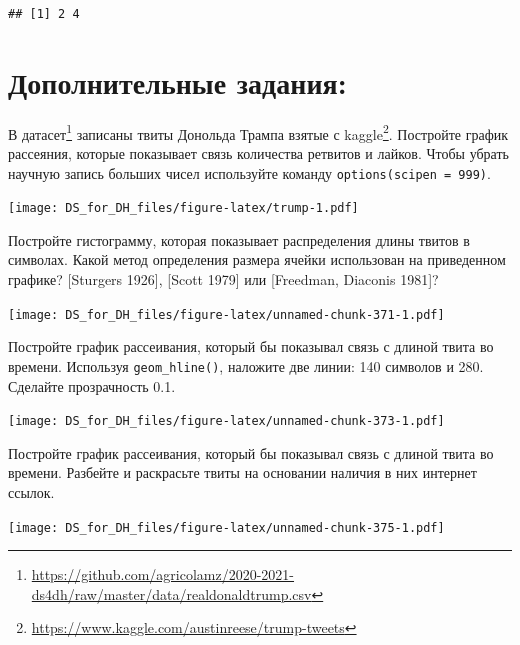 \documentclass[
]{book}
\makeatletter
\renewcommand{\href}[2]{#2\footnote{\url{#1}}}
\newenvironment{kframe}{%
    \medskip{}
    \setlength{\fboxsep}{.8em}
    \def\at@end@of@kframe{}%
    \ifinner\ifhmode%
    \def\at@end@of@kframe{\end{minipage}}%
    \begin{minipage}{\columnwidth}%
    \fi\fi%
    \def\FrameCommand##1{\hskip\@totalleftmargin \hskip-\fboxsep
    \colorbox{shadecolor}{##1}\hskip-\fboxsep
        \hskip-\linewidth \hskip-\@totalleftmargin \hskip\columnwidth}%
    \MakeFramed {\advance\hsize-\width
      \@totalleftmargin\z@ \linewidth\hsize
      \@setminipage}}%
  {\par\unskip\endMakeFramed%
    \at@end@of@kframe}
\newenvironment{rmdblock}[1]
  {
    \begin{itemize}
    \renewcommand{\labelitemi}{
      \raisebox{-.7\height}[0pt][0pt]{
        {\setkeys{Gin}{width=3em,keepaspectratio}\texttt{[image: images/\#1]}}
        }
        }
        \setlength{\fboxsep}{1em}
        \begin{kframe}
        \item
      }
      {
        \end{kframe}
        \end{itemize}
      }
\newenvironment{rmdtask}
      {\begin{rmdblock}{task}}
      {\end{rmdblock}}
\makeatother
\begin{document}
\begin{verbatim}
## [1] 2 4
\end{verbatim}

\hypertarget{ux434ux43eux43fux43eux43bux43dux438ux442ux435ux43bux44cux43dux44bux435-ux437ux430ux434ux430ux43dux438ux44f}{%
\section{Дополнительные задания:}\label{ux434ux43eux43fux43eux43bux43dux438ux442ux435ux43bux44cux43dux44bux435-ux437ux430ux434ux430ux43dux438ux44f}}

\begin{rmdtask}
В
\href{https://github.com/agricolamz/2020-2021-ds4dh/raw/master/data/realdonaldtrump.csv}{датасет}
записаны твиты Донольда Трампа взятые с
\href{https://www.kaggle.com/austinreese/trump-tweets}{kaggle}.
Постройте график рассеяния, которые показывает связь количества ретвитов
и лайков. Чтобы убрать научную запись больших чисел используйте команду
\texttt{options(scipen\ =\ 999)}.
\end{rmdtask}

\texttt{[image: DS\_for\_DH\_files/figure-latex/trump-1.pdf]}

\begin{rmdtask}
Постройте гистограмму, которая показывает распределения длины твитов в
символах. Какой метод определения размера ячейки использован на
приведенном графике? {[}Sturgers 1926{]}, {[}Scott 1979{]} или
{[}Freedman, Diaconis 1981{]}?
\end{rmdtask}

\texttt{[image: DS\_for\_DH\_files/figure-latex/unnamed-chunk-371-1.pdf]}

\begin{rmdtask}
Постройте график рассеивания, который бы показывал связь с длиной твита
во времени. Используя \texttt{geom\_hline()}, наложите две линии: 140
символов и 280. Сделайте прозрачность 0.1.
\end{rmdtask}

\texttt{[image: DS\_for\_DH\_files/figure-latex/unnamed-chunk-373-1.pdf]}

\begin{rmdtask}
Постройте график рассеивания, который бы показывал связь с длиной твита
во времени. Разбейте и раскрасьте твиты на основании наличия в них
интернет ссылок.
\end{rmdtask}

\texttt{[image: DS\_for\_DH\_files/figure-latex/unnamed-chunk-375-1.pdf]}
\end{document}
